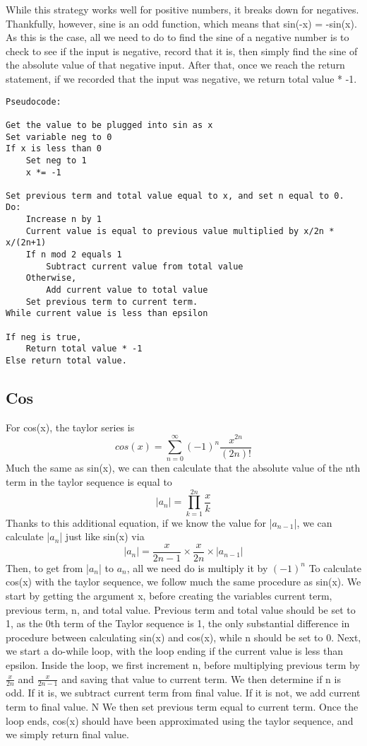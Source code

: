 \documentclass[11pt]{article}
\begin{document}
While this strategy works well for positive numbers, it breaks down for negatives. Thankfully, however, sine is an odd function, which means that sin(-x) = -sin(x). As this is the case, all we need to do to find the sine of a negative number is to check to see if the input is negative, record that it is, then simply find the sine of the absolute value of that negative input. After that, once we reach the return statement, if we recorded that the input was negative, we return total value * -1.

\begin{verbatim}
Pseudocode:

Get the value to be plugged into sin as x
Set variable neg to 0
If x is less than 0
    Set neg to 1
    x *= -1

Set previous term and total value equal to x, and set n equal to 0.
Do:
    Increase n by 1
    Current value is equal to previous value multiplied by x/2n * x/(2n+1)
    If n mod 2 equals 1
        Subtract current value from total value
    Otherwise,
        Add current value to total value
    Set previous term to current term.
While current value is less than epsilon

If neg is true,
    Return total value * -1
Else return total value.
\end{verbatim}

\subsection{Cos}

For cos(x), the taylor series is
\[
cos(x) = \sum_{n=0}^{\infty} (-1)^n \frac {x^{2n}} {(2n)!}
\]
Much the same as sin(x), we can then calculate that the absolute value of the nth term in the taylor sequence is equal to
\[
|a_n| = \prod_{k=1}^{2n} \frac x k
\]
Thanks to this additional equation, if we know the value for |$a_{n-1}$|, we can calculate |$a_n$| just like sin(x) via
\[
|a_n| = \frac x {2n-1} \times \frac x {2n} \times |a_{n-1}|
\]
Then, to get from |$a_n$| to $a_n$, all we need do is multiply it by $(-1)^n$
To calculate cos(x) with the taylor sequence, we follow much the same procedure as sin(x). We start by getting the argument x, before creating the variables current term, previous term, n, and total value. Previous term and total value should be set to 1, as the 0th term of the Taylor sequence is 1, the only substantial difference in procedure between calculating sin(x) and cos(x), while n should be set to 0. Next, we start a do-while loop, with the loop ending if the current value is less than epsilon. Inside the loop, we first increment n, before multiplying previous term by $\frac x {2n}$ and $\frac x {2n-1}$ and saving that value to current term. We then determine if n is odd. If it is, we subtract current term from final value. If it is not, we add current term to final value. N We then set previous term equal to current term. Once the loop ends, cos(x) should have been approximated using the taylor sequence, and we simply return final value.
\end{document}
